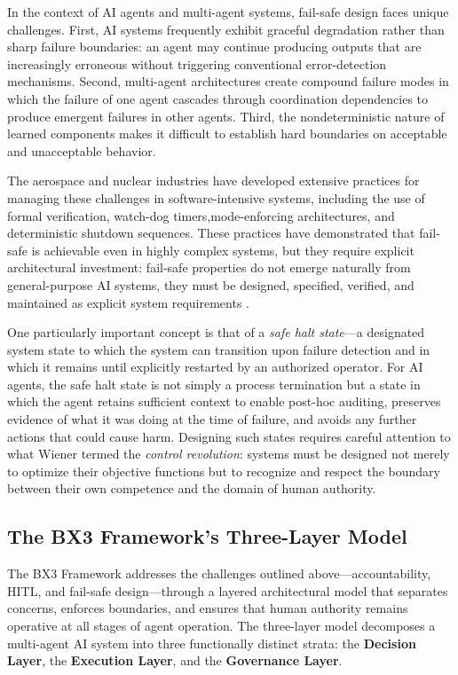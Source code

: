 In the context of AI agents and multi-agent systems, fail-safe design faces unique challenges. First, AI systems frequently exhibit graceful degradation rather than sharp failure boundaries: an agent may continue producing outputs that are increasingly erroneous without triggering conventional error-detection mechanisms. Second, multi-agent architectures create compound failure modes in which the failure of one agent cascades through coordination dependencies to produce emergent failures in other agents. Third, the nondeterministic nature of learned components makes it difficult to establish hard boundaries on acceptable and unacceptable behavior.

The aerospace and nuclear industries have developed extensive practices for managing these challenges in software-intensive systems, including the use of formal verification, watch-dog timers,mode-enforcing architectures, and deterministic shutdown sequences. These practices have demonstrated that fail-safe is achievable even in highly complex systems, but they require explicit architectural investment: fail-safe properties do not emerge naturally from general-purpose AI systems, they must be designed, specified, verified, and maintained as explicit system requirements \cite{tristr81}.

One particularly important concept is that of a \emph{safe halt state}—a designated system state to which the system can transition upon failure detection and in which it remains until explicitly restarted by an authorized operator. For AI agents, the safe halt state is not simply a process termination but a state in which the agent retains sufficient context to enable post-hoc auditing, preserves evidence of what it was doing at the time of failure, and avoids any further actions that could cause harm. Designing such states requires careful attention to what Wiener termed the \emph{control revolution}: systems must be designed not merely to optimize their objective functions but to recognize and respect the boundary between their own competence and the domain of human authority.

\subsection{The BX3 Framework's Three-Layer Model}

The BX3 Framework addresses the challenges outlined above—accountability, HITL, and fail-safe design—through a layered architectural model that separates concerns, enforces boundaries, and ensures that human authority remains operative at all stages of agent operation. The three-layer model decomposes a multi-agent AI system into three functionally distinct strata: the \textbf{Decision Layer}, the \textbf{Execution Layer}, and the \textbf{Governance Layer}.

